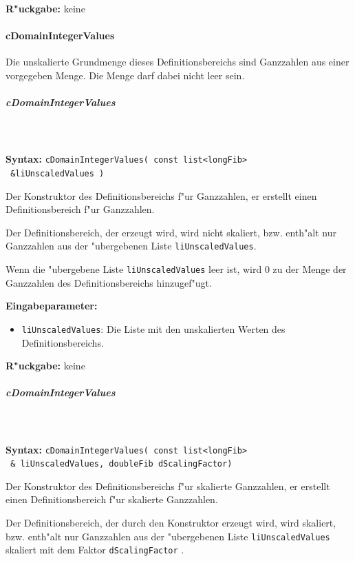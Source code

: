 \bigskip\noindent
\textbf{R"uckgabe:} keine


\paragraph{cDomainIntegerValues}

Die unskalierte Grundmenge dieses Definitionsbereichs sind Ganzzahlen aus einer vorgegeben Menge. Die Menge darf dabei nicht leer sein.


\subparagraph{cDomainIntegerValues}

\ \\\\\noindent
\textbf{Syntax:} \verb|cDomainIntegerValues( const list<longFib>| \\\verb| &liUnscaledValues )|

\bigskip\noindent
Der Konstruktor des Definitionsbereichs f"ur Ganzzahlen, er erstellt einen Definitionsbereich f"ur Ganzzahlen.

Der Definitionsbereich, der erzeugt wird, wird nicht skaliert, bzw. enth"alt nur Ganzzahlen aus der "ubergebenen Liste \verb|liUnscaledValues|.

Wenn die "ubergebene Liste \verb|liUnscaledValues| leer ist, wird $0$ zu der Menge der Ganzzahlen des Definitionsbereichs hinzugef"ugt.

\bigskip\noindent
\textbf{Eingabeparameter:}
\begin{itemize}
 \item \verb|liUnscaledValues|: Die Liste mit den unskalierten Werten des Definitionsbereichs.
\end{itemize}

\bigskip\noindent
\textbf{R"uckgabe:} keine


\subparagraph{cDomainIntegerValues}

\ \\\\\noindent
\textbf{Syntax:} \verb|cDomainIntegerValues( const list<longFib>| \\\verb| & liUnscaledValues, doubleFib dScalingFactor)|

\bigskip\noindent
Der Konstruktor des Definitionsbereichs f"ur skalierte Ganzzahlen, er erstellt einen Definitionsbereich f"ur skalierte Ganzzahlen.

Der Definitionsbereich, der durch den Konstruktor erzeugt wird, wird skaliert, bzw. enth"alt nur Ganzzahlen aus der "ubergebenen Liste \verb|liUnscaledValues| skaliert mit dem Faktor \verb|dScalingFactor| .

